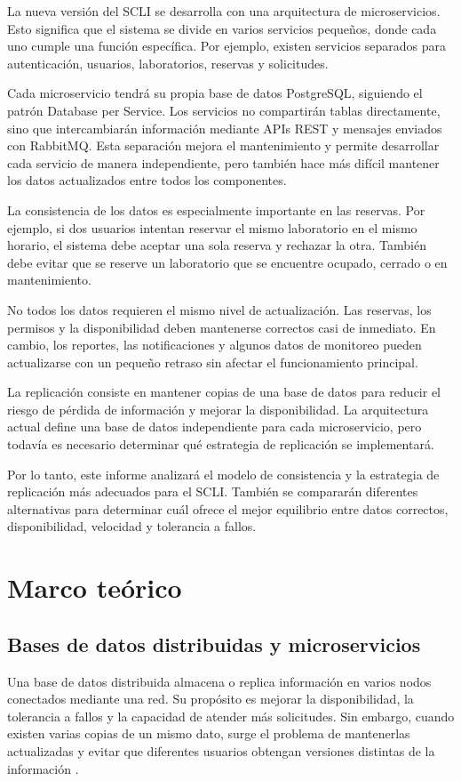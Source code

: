 \documentclass[conference]{IEEEtran}
\begin{document}
La nueva versión del SCLI se desarrolla con una arquitectura de microservicios. Esto significa que el sistema se divide en varios servicios pequeños, donde cada uno cumple una función específica. Por ejemplo, existen servicios separados para autenticación, usuarios, laboratorios, reservas y solicitudes.

Cada microservicio tendrá su propia base de datos PostgreSQL, siguiendo el patrón Database per Service. Los servicios no compartirán tablas directamente, sino que intercambiarán información mediante APIs REST y mensajes enviados con RabbitMQ. Esta separación mejora el mantenimiento y permite desarrollar cada servicio de manera independiente, pero también hace más difícil mantener los datos actualizados entre todos los componentes.

La consistencia de los datos es especialmente importante en las reservas. Por ejemplo, si dos usuarios intentan reservar el mismo laboratorio en el mismo horario, el sistema debe aceptar una sola reserva y rechazar la otra. También debe evitar que se reserve un laboratorio que se encuentre ocupado, cerrado o en mantenimiento.

No todos los datos requieren el mismo nivel de actualización. Las reservas, los permisos y la disponibilidad deben mantenerse correctos casi de inmediato. En cambio, los reportes, las notificaciones y algunos datos de monitoreo pueden actualizarse con un pequeño retraso sin afectar el funcionamiento principal.

La replicación consiste en mantener copias de una base de datos para reducir el riesgo de pérdida de información y mejorar la disponibilidad. La arquitectura actual define una base de datos independiente para cada microservicio, pero todavía es necesario determinar qué estrategia de replicación se implementará.

Por lo tanto, este informe analizará el modelo de consistencia y la estrategia de replicación más adecuados para el SCLI. También se compararán diferentes alternativas para determinar cuál ofrece el mejor equilibrio entre datos correctos, disponibilidad, velocidad y tolerancia a fallos.

\section{Marco teórico}

\subsection{Bases de datos distribuidas y microservicios}
Una base de datos distribuida almacena o replica información en varios nodos conectados mediante una red. Su propósito es mejorar la disponibilidad, la tolerancia a fallos y la capacidad de atender más solicitudes. Sin embargo, cuando existen varias copias de un mismo dato, surge el problema de mantenerlas actualizadas y evitar que diferentes usuarios obtengan versiones distintas de la información \cite{ref1}.
\end{document}
